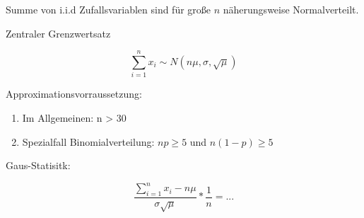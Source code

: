 \documentclass[a4paper]{article}
\begin{document}
Summe von i.i.d Zufallsvariablen sind für große $n$ näherungsweise Normalverteilt.

Zentraler Grenzwertsatz

\[
\sum_{i=1}^{n} x_i \sim N(n\mu, \sigma, \sqrt{\mu})
\]

Approximationsvorraussetzung:

\begin{enumerate}
    \item Im Allgemeinen: n > 30
    \item Spezialfall Binomialverteilung: $np \geq 5$ und $n(1-p) \geq 5$
\end{enumerate}

Gaus-Statisitk:

\[
\frac{\sum_{i=1}^{n}x_i - n\mu}{\sigma \sqrt{\mu}}*\frac{1}{n} = ...
\]

\end{document}
